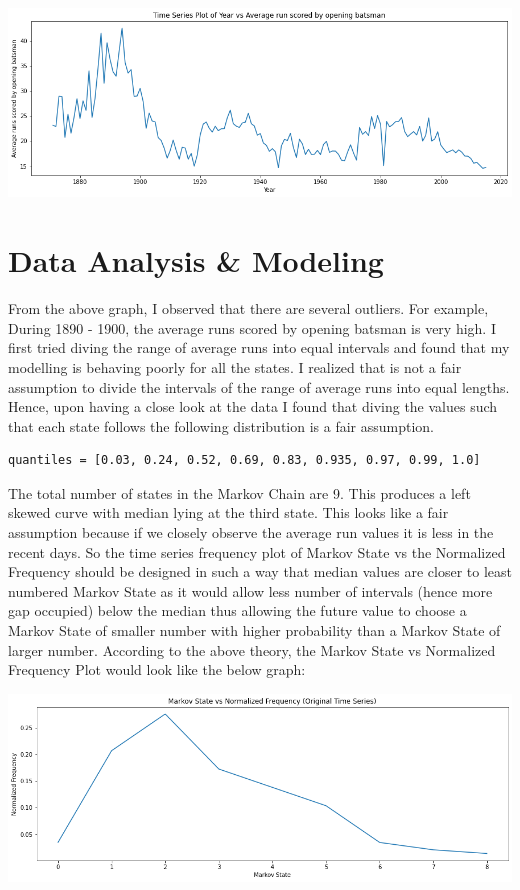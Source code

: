 \documentclass[a4paper, article, oneside, UKenglish]{memoir}
\newcommand{\0}{\mathbf{0}}
\newcommand{\1}{\mathbf{1}}
\begin{document}
\centerline{\includegraphics[scale=0.5]{projectfp-images/YearVsAverageRunsPlot.png}}


\chapter{Data Analysis \& Modeling}

From the above graph, I observed that there are several outliers. For example, During 1890 - 1900, the average runs scored by opening batsman is very high. I first tried diving the range of average runs into equal intervals and found that my modelling is behaving poorly for all the states. I realized that is not a fair assumption to divide the intervals of the range of average runs into equal lengths. Hence, upon having a close look at the data I found that diving the values such that each state follows the following distribution is a fair assumption.

\begin{verbatim}
quantiles = [0.03, 0.24, 0.52, 0.69, 0.83, 0.935, 0.97, 0.99, 1.0]
\end{verbatim}

The total number of states in the Markov Chain are 9. This produces a left skewed curve with median lying at the third state. This looks like a fair assumption because if we closely observe the average run values it is less in the recent days. So the time series frequency plot of Markov State vs the Normalized Frequency should be designed in such a way that median values are closer to least numbered Markov State as it would allow less number of intervals (hence more gap occupied) below the median thus allowing the future value to choose a Markov State of smaller number with higher probability than a Markov State of larger number. According to the above theory, the Markov State vs Normalized Frequency Plot would look like the below graph:

\centerline{\includegraphics[scale=0.5]{projectfp-images/MarkovStateVsNormalizedFrequencyPlotOriginal.png}}
\end{document}
